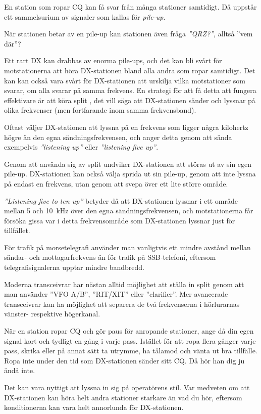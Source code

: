 En station som ropar CQ kan få svar från många stationer samtidigt.
Då uppstår ett sammelsurium av signaler som kallas för \emph{pile-up}.

När stationen betar av en pile-up kan stationen även fråga \emph{''QRZ?''},
alltså ''vem där''?

Ett rart DX kan drabbas av enorma pile-ups, och det kan bli svårt för
motstationerna att höra DX-stationen bland alla andra som ropar samtidigt.
Det kan kan också vara svårt för DX-stationen att urskilja vilka motstationer
som svarar, om alla svarar på samma frekvens.
En strategi för att få detta att fungera effektivare är att köra split
\cite{LowBandDX}, det vill säga att DX-stationen sänder och lyssnar på olika
frekvenser (men fortfarande inom samma frekvensband).

Oftast väljer DX-stationen att lyssna på en frekvens som ligger några kilohertz
högre än den egna sändningsfrekvensen, och anger detta genom att sända
exempelvis \emph{''listening up''} eller \emph{''listening five up''}.

Genom att använda sig av split undviker DX-stationen att störas ut av sin egen
pile-up.
DX-stationen kan också välja sprida ut sin pile-up, genom att inte lyssna på
endast en frekvens, utan genom att svepa över ett lite större område.

\emph{''Listening five to ten up''} betyder då att DX-stationen lyssnar i ett
område mellan 5 och \qty{10}{\kilo\hertz} över den egna sändningsfrekvensen, och
motstationerna får försöka gissa var i detta frekvensområde som DX-stationen
lyssnar just för tillfället.

För trafik på morsetelegrafi använder man vanligtvis ett mindre avstånd mellan
sändar- och mottagarfrekvens än för trafik på SSB-telefoni, eftersom
telegrafisignalerna upptar mindre bandbredd.

Moderna transceivrar har nästan alltid möjlighet att ställa in split genom att
man använder ''VFO A/B'', ''RIT/XIT'' eller ''clarifier''.
Mer avancerade transceivrar kan ha möjlighet att separera de två frekvenserna i
hörlurarnas vänster- respektive högerkanal.

När en station ropar CQ och gör paus för anropande stationer, ange då din egen
signal kort och tydligt en gång i varje pass.
Istället för att ropa flera gånger varje pass, skrika eller på annat sätt
ta utrymme, ha tålamod och vänta ut bra tillfälle.
Ropa inte under den tid som DX-stationen sänder sitt CQ. Då hör han dig ju ändå inte.

Det kan vara nyttigt att lyssna in sig på operatörens stil.
Var medveten om att DX-stationen kan höra helt andra stationer starkare än vad
du hör, eftersom konditionerna kan vara helt annorlunda för DX-stationen.

